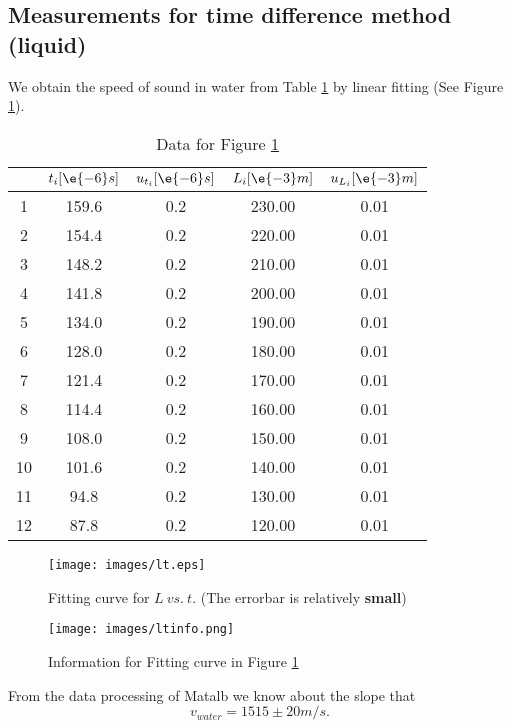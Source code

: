\subsection{Measurements for time difference method (liquid)}
    We obtain the speed of sound in water from Table \ref{data_tim} by linear fitting (See Figure \ref{lt}).
    \begin{table}[H] \small
        \centering
        \begin{tabular}{|c|c|c|c|c|}
        \hline
            & $t_i[\e{-6}s]$ & $u_{t_i}[\e{-6}s]$ & $L_i[\e{-3}m]$ & $u_{L_i}[\e{-3}m]$\\\hline
            1 & 159.6 & 0.2 & 230.00 & 0.01\\\hline
            2 & 154.4 & 0.2 & 220.00 & 0.01\\\hline
            3 & 148.2 & 0.2 & 210.00 & 0.01\\\hline
            4 & 141.8 & 0.2 & 200.00 & 0.01\\\hline
            5 & 134.0 & 0.2 & 190.00 & 0.01\\\hline
            6 & 128.0 & 0.2 & 180.00 & 0.01\\\hline
            7 & 121.4 & 0.2 & 170.00 & 0.01\\\hline
            8 & 114.4 & 0.2 & 160.00 & 0.01\\\hline
            9 & 108.0 & 0.2 & 150.00 & 0.01\\\hline
            10 & 101.6 & 0.2 & 140.00 & 0.01\\\hline
            11 & 94.8 & 0.2 & 130.00 & 0.01\\\hline
            12 & 87.8 & 0.2 & 120.00 & 0.01\\\hline
        \end{tabular}
        \caption{Data for Figure \ref{lt}}\label{data_tim}
    \end{table}
    \begin{figure}[H]
        \centering
        \texttt{[image: images/lt.eps]}
        \caption{Fitting curve for $L\ vs.\ t$. (The errorbar is relatively \textbf{small})}\label{lt}
    \end{figure}
    \begin{figure}[H]
        \centering
        \texttt{[image: images/ltinfo.png]}
        \caption{Information for Fitting curve in Figure \ref{lt}}\label{ltinfo}
    \end{figure}

    From the data processing of Matalb we know about the slope that 
    \[
        v_{water}=1515\pm20m/s.
    \]